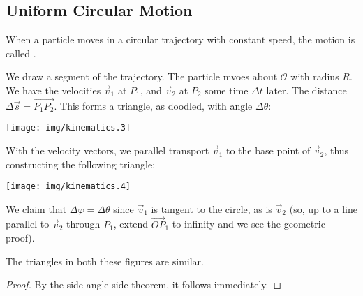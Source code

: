 \subsection{Uniform Circular Motion}

When a particle moves in a circular trajectory with constant speed, the
motion is called .

\M
We draw a segment of the trajectory. The particle mvoes about
$\mathcal{O}$ with radius $R$. We have the velocities $\vec{v}_{1}$ at
$P_{1}$, and $\vec{v}_{2}$ at $P_{2}$ some time $\Delta t$ later. The
distance $\Delta\vec{s}=\overrightarrow{P_{1}P_{2}}$. This forms a triangle, as
doodled, with angle $\Delta\theta$:
\begin{center}
\texttt{[image: img/kinematics.3]}
\end{center}
With the velocity vectors, we parallel transport $\vec{v}_{1}$ to the
base point of $\vec{v}_{2}$, thus constructing the following triangle:
\begin{center}
\texttt{[image: img/kinematics.4]}
\end{center}
We claim that $\Delta\varphi=\Delta\theta$ since $\vec{v}_{1}$ is
tangent to the circle, as is $\vec{v}_{2}$ (so, up to a line parallel to
$\vec{v}_{2}$ through $P_{1}$, extend $\overrightarrow{OP}_{1}$ to infinity
and we see the geometric proof).

 The triangles in both these figures are similar.

\begin{proof}
By the side-angle-side theorem, it follows immediately.
\end{proof}

